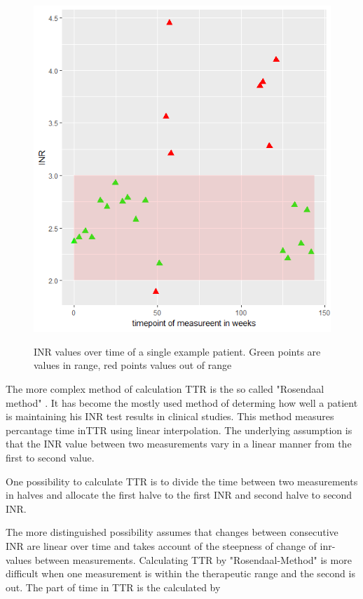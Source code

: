 \begin{figure}
	\centering
	\includegraphics{inr_scatterplot.png}
	\label{example_patient}
	\caption{INR values over time of a single example patient. Green points are values in range, red points values out of range} 
\end{figure}

The more complex method of calculation \ac{TTR} is the so called "Rosendaal method" \cite{Rosendaal_1993}. It has become the mostly used method of determing how well a patient is maintaining his \ac{INR} test results in clinical studies. This method measures percantage time in\ac{TTR} using linear interpolation. The underlying assumption is that the \ac{INR} value between two measurements vary in a linear manner from the first to second value. 

One possibility to calculate \ac{TTR} is to divide the time between two measurements in  halves and allocate the first halve to the first \ac{INR} and second halve to second \ac{INR}.

The more distinguished possibility assumes that changes between consecutive \ac{INR} are linear over time and takes account of the steepness of change of inr-values between measurements. Calculating \ac{TTR} by "Rosendaal-Method" is more difficult when one measurement is within the therapeutic range and the second is out. The part of time in \ac{TTR} is the calculated by

